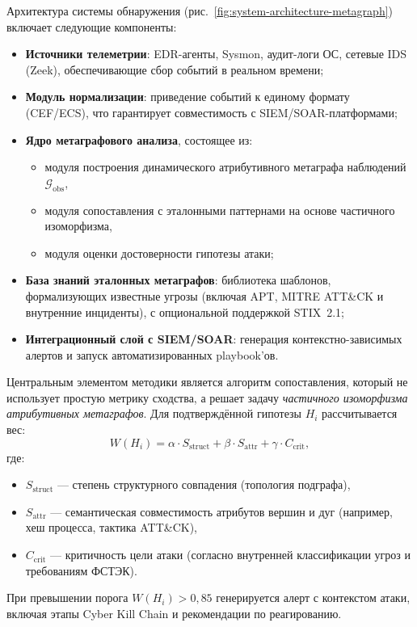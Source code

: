 Архитектура системы обнаружения (рис.~\ref{fig:system-architecture-metagraph}) включает следующие компоненты:
\begin{itemize}
    \item \textbf{Источники телеметрии}: EDR-агенты, Sysmon, аудит-логи ОС, сетевые IDS (Zeek), обеспечивающие сбор событий в реальном времени;
    \item \textbf{Модуль нормализации}: приведение событий к единому формату (CEF/ECS), что гарантирует совместимость с SIEM/SOAR-платформами;
    \item \textbf{Ядро метаграфового анализа}, состоящее из:
    \begin{itemize}
        \item модуля построения динамического атрибутивного метаграфа наблюдений $\mathcal{G}_{\text{obs}}$,
        \item модуля сопоставления с эталонными паттернами на основе частичного изоморфизма,
        \item модуля оценки достоверности гипотезы атаки;
    \end{itemize}
    \item \textbf{База знаний эталонных метаграфов}: библиотека шаблонов, формализующих известные угрозы (включая APT, MITRE ATT\&CK и внутренние инциденты), с опциональной поддержкой STIX~2.1;
    \item \textbf{Интеграционный слой с SIEM/SOAR}: генерация контекстно-зависимых алертов и запуск автоматизированных playbook'ов.
\end{itemize}

Центральным элементом методики является алгоритм сопоставления, который не использует простую метрику сходства, а решает задачу \textit{частичного изоморфизма атрибутивных метаграфов}. Для подтверждённой гипотезы $H_i$ рассчитывается вес:
\begin{equation}
W(H_i) = \alpha \cdot S_{\text{struct}} + \beta \cdot S_{\text{attr}} + \gamma \cdot C_{\text{crit}},
\end{equation}
где:
\begin{itemize}
    \item $S_{\text{struct}}$ — степень структурного совпадения (топология подграфа),
    \item $S_{\text{attr}}$ — семантическая совместимость атрибутов вершин и дуг (например, хеш процесса, тактика ATT\&CK),
    \item $C_{\text{crit}}$ — критичность цели атаки (согласно внутренней классификации угроз и требованиям ФСТЭК).
\end{itemize}
При превышении порога $W(H_i) > 0{,}85$ генерируется алерт с контекстом атаки, включая этапы Cyber Kill Chain и рекомендации по реагированию.

